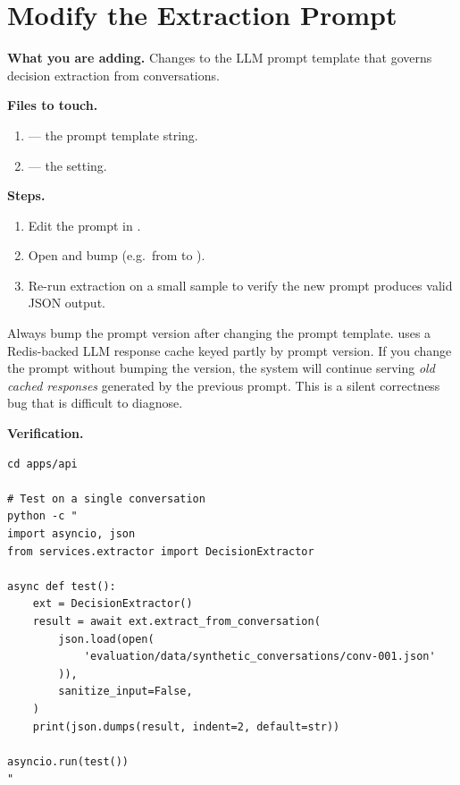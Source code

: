 \section{Modify the Extraction Prompt}
\label{sec:modify-extraction-prompt}

\noindent\textbf{What you are adding.}
Changes to the LLM prompt template that governs decision extraction from
conversations.

\medskip\noindent\textbf{Files to touch.}

\begin{enumerate}
    \item {} --- the prompt
          template string.
    \item {} --- the
           setting.
\end{enumerate}

\medskip\noindent\textbf{Steps.}

\begin{enumerate}
    \item Edit the prompt in .
    \item Open  and bump
           (e.g.\ from
           to ).
    \item Re-run extraction on a small sample to verify the new prompt
          produces valid JSON output.
\end{enumerate}

\begin{warning}
Always bump the prompt version after changing the prompt template.
\sysname{} uses a Redis-backed LLM response cache keyed partly by prompt
version.  If you change the prompt without bumping the version, the system
will continue serving \emph{old cached responses} generated by the
previous prompt.  This is a silent correctness bug that is difficult to
diagnose.
\end{warning}

\medskip\noindent\textbf{Verification.}

\begin{lstlisting}[style=bash, numbers=none]
cd apps/api

# Test on a single conversation
python -c "
import asyncio, json
from services.extractor import DecisionExtractor

async def test():
    ext = DecisionExtractor()
    result = await ext.extract_from_conversation(
        json.load(open(
            'evaluation/data/synthetic_conversations/conv-001.json'
        )),
        sanitize_input=False,
    )
    print(json.dumps(result, indent=2, default=str))

asyncio.run(test())
"
\end{lstlisting}

